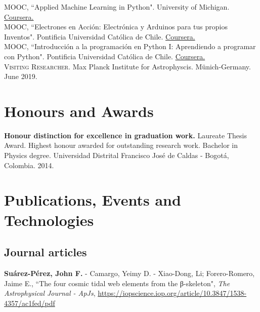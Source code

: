 \documentclass[10pt, a4paper]{article}
\newcommand{\years}[1]{\marginnote{\scriptsize #1}}
\begin{document}
\years{2020}\textsc{MOOC}, “Applied Machine Learning in Python". University of Michigan. \href{https://coursera.org/share/620fe326f4cc26b1f4a9bf77690114ae}{Coursera.}\\

\years{2019}\textsc{MOOC}, “Electrones en Acción: Electrónica y Arduinos para tus propios Inventos". Pontificia Universidad Católica de Chile. \href{https://www.coursera.org/account/accomplishments/certificate/W5M5CZ3XE557}{Coursera.}\\

\years{2019}\textsc{MOOC}, “Introducción a la programación en Python I: Aprendiendo a programar con Python". Pontificia Universidad Católica de Chile. \href{https://www.coursera.org/account/accomplishments/certificate/8UEF5TUY6ACB}{Coursera.}\\

\years{2019}\textsc{Visiting Researcher}. Max Planck Institute for Astrophyscis. Münich-Germany. {June 2019}.\\


\section*{Honours and Awards}
\noindent
\years{2014}\textbf{Honour distinction for excellence in graduation work.} Laureate Thesis Award. Highest honour awarded for outstanding research work. Bachelor in Physics degree. Universidad Distrital Francisco José de Caldas - Bogotá, Colombia. 2014.

\section*{Publications, Events and Technologies}

\subsection*{Journal articles}
\noindent
\years{2021}\textbf{Suárez-Pérez, John F.} - Camargo, Yeimy D. - Xiao-Dong, Li; Forero-Romero, Jaime E., “The four cosmic tidal web elements from the β-skeleton", \emph{The Astrophysical Journal - ApJs}, \url{https://iopscience.iop.org/article/10.3847/1538-4357/ac1fed/pdf} 
\\
\end{document}
